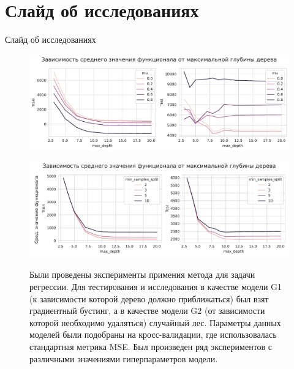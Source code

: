 \documentclass[10pt,pdf,hyperref={unicode}]{beamer}
\begin{document}
	\section{Слайд об исследованиях}
	\begin{frame}{Слайд об исследованиях}
		
		\begin{figure}[h]
	\begin{center}
		\begin{minipage}[h]{0.5\linewidth}
			{\includegraphics[width=\linewidth]{../figures/max_depth_task1_gamma_08_min_2.pdf}}	
		\end{minipage}
		\begin{center}
		\begin{minipage}[h]{0.5\linewidth}
			{\includegraphics[width=\linewidth]{../figures/max_depth_task1_gamma_02_mu_02.pdf}}	
		\end{minipage}
	\end{center}
	\end{center}
	
	Были проведены эксперименты примения метода для задачи регрессии. Для тестирования и исследования в качестве модели G1 (к зависимости которой дерево должно приближаться) был взят градиентный бустинг, а в качестве модели G2 (от зависимости которой необходимо удаляться) случайный лес. Параметры данных моделей были подобраны на кросс-валидации, где использовалась стандартная метрика MSE. Был произведен ряд экспериментов с различными значениями гиперпараметров модели.
	
	\label{ris:image7}
\end{figure}
		
	\end{frame}
	
\end{document}
